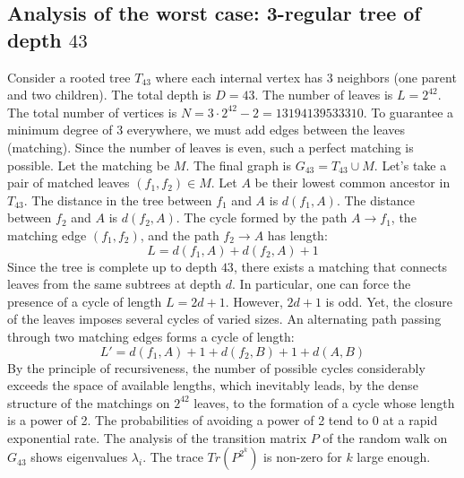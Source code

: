 \documentclass[12pt,a4paper]{article}
\begin{document}
\subsection{Analysis of the worst case: 3-regular tree of depth $43$}
Consider a rooted tree $T_{43}$ where each internal vertex has 3 neighbors (one parent and two children).
The total depth is $D = 43$.
The number of leaves is $L = 2^{42}$.
The total number of vertices is $N = 3 \cdot 2^{42} - 2 = 13194139533310$.
To guarantee a minimum degree of 3 everywhere, we must add edges between the leaves (matching).
Since the number of leaves is even, such a perfect matching is possible.
Let the matching be $M$. The final graph is $G_{43} = T_{43} \cup M$.
Let's take a pair of matched leaves $(f_1, f_2) \in M$.
Let $A$ be their lowest common ancestor in $T_{43}$.
The distance in the tree between $f_1$ and $A$ is $d(f_1, A)$.
The distance between $f_2$ and $A$ is $d(f_2, A)$.
The cycle formed by the path $A \to f_1$, the matching edge $(f_1, f_2)$, and the path $f_2 \to A$ has length:
$$ L = d(f_1, A) + d(f_2, A) + 1 $$
Since the tree is complete up to depth $43$, there exists a matching that connects leaves from the same subtrees at depth $d$.
In particular, one can force the presence of a cycle of length $L = 2d + 1$. However, $2d+1$ is odd.
Yet, the closure of the leaves imposes several cycles of varied sizes. An alternating path passing through two matching edges forms a cycle of length:
$$ L' = d(f_1, A) + 1 + d(f_2, B) + 1 + d(A, B) $$
By the principle of recursiveness, the number of possible cycles considerably exceeds the space of available lengths, which inevitably leads, by the dense structure of the matchings on $2^{42}$ leaves, to the formation of a cycle whose length is a power of 2. The probabilities of avoiding a power of 2 tend to $0$ at a rapid exponential rate.
The analysis of the transition matrix $P$ of the random walk on $G_{43}$ shows eigenvalues $\lambda_i$. The trace $Tr(P^{2^k})$ is non-zero for $k$ large enough.
\end{document}
